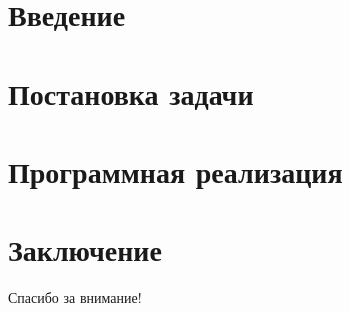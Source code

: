 \documentclass[9pt]{beamer}
\begin{document}

\section{Введение}


\section{Постановка задачи}

\section{Программная реализация}

\section*{Заключение}

\def\secname{}

\begin{frame}

    \begin{center}
        \LARGE
        Спасибо за внимание!
    \end{center}

\end{frame}
\end{document}
